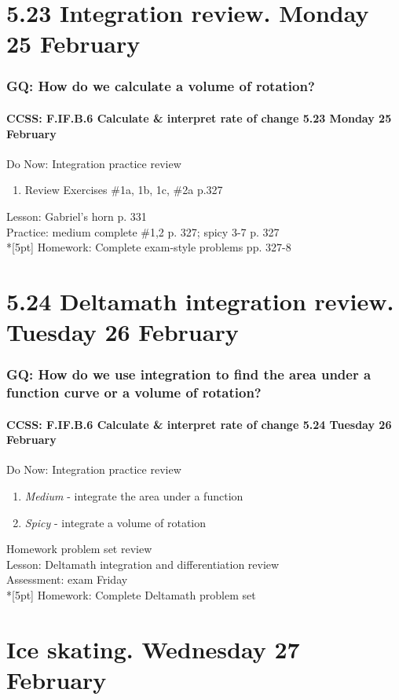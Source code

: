 \documentclass{beamer}
\begin{document}
\section{5.23 Integration review. Monday 25 February}
  \frame
  {
    \frametitle{GQ: How do we calculate a volume of rotation?}
    \framesubtitle{CCSS: F.IF.B.6 Calculate \& interpret rate of change \hfill \alert{5.23 Monday 25 February}}

    \begin{block}{Do Now: Integration practice review}
    \begin{enumerate}
        \item Review Exercises \#1a, 1b, 1c, \#2a p.327
    \end{enumerate}
    \end{block}
    Lesson: Gabriel's horn p. 331\\
    Practice: medium complete \#1,2 p. 327; spicy 3-7 p. 327\\*[5pt]
    Homework: Complete exam-style problems pp. 327-8
  }

  \section{5.24 Deltamath integration review. Tuesday 26 February}
  \frame
  {
    \frametitle{GQ: How do we use integration to find the area under a function curve or a volume of rotation?}
    \framesubtitle{CCSS: F.IF.B.6 Calculate \& interpret rate of change \hfill \alert{5.24 Tuesday 26 February}}

      \begin{block}{Do Now: Integration practice review}
      \begin{enumerate}
          \item \emph{Medium} - integrate the area under a function
          \item \emph{Spicy} - integrate a volume of rotation
      \end{enumerate}
      \end{block}
    Homework problem set review\\
    Lesson: Deltamath integration and differentiation review\\
    Assessment: \alert{exam Friday}\\*[5pt]
    Homework: Complete Deltamath problem set
  }

\section{Ice skating. Wednesday 27 February}
\end{document}
